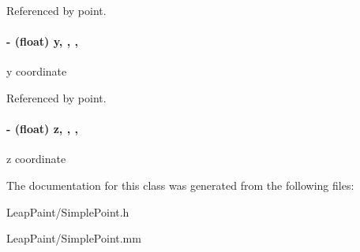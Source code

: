 Referenced by point.

\hypertarget{interface_simple_point_ae10ba2c5156e6061258a0720443cd1c8}{
\paragraph[{y}]{\setlength{\rightskip}{0pt plus 5cm}-\/ (float) y\hspace{0.3cm}{\ttfamily [read]}, {\ttfamily [write]}, {\ttfamily [nonatomic]}, {\ttfamily [assign]}}}\label{d9/dc7/interface_simple_point_ae10ba2c5156e6061258a0720443cd1c8}
y coordinate 

Referenced by point.

\hypertarget{interface_simple_point_ad74ae8e5d653579e791c040155e7d4d6}{
\paragraph[{z}]{\setlength{\rightskip}{0pt plus 5cm}-\/ (float) z\hspace{0.3cm}{\ttfamily [read]}, {\ttfamily [write]}, {\ttfamily [nonatomic]}, {\ttfamily [assign]}}}\label{d9/dc7/interface_simple_point_ad74ae8e5d653579e791c040155e7d4d6}
z coordinate 

The documentation for this class was generated from the following files\-:\begin{DoxyCompactItemize}
\item 
Leap\-Paint/Simple\-Point.\-h\item 
Leap\-Paint/Simple\-Point.\-mm\end{DoxyCompactItemize}
